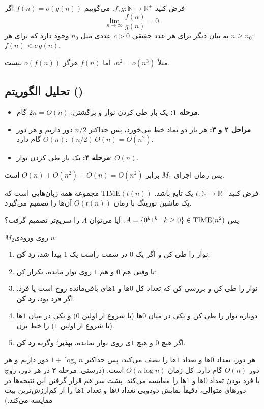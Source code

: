 \begin{definition}[$o$ کوچک]
فرض کنید $f,g:\mathbb{N}\to\mathbb{R}^+$. می‌گوییم $f(n)=o(g(n))$ اگر
\[\lim_{n\to\infty}\frac{f(n)}{g(n)}=0.\]
به بیان دیگر برای هر عدد حقیقی $c>0$ عددی مثل $n_0$ وجود دارد که برای هر $n\ge n_0$: $f(n)<c\,g(n)$.
\end{definition}

مثلاً $n^2=o(n^3)$، اما $f(n)$ هرگز $o(f(n))$ نیست.

\subsection{تحلیل الگوریتم ()}

\begin{example}[تحلیل $M_1$]
\begin{itemize}
\item \textbf{مرحله ۱:} یک بار طی کردن نوار و برگشتن: $2n=O(n)$ گام.
\item \textbf{مراحل ۲ و ۳:} هر بار دو نماد خط می‌خورد، پس حداکثر $n/2$ دور داریم و هر دور $O(n)$ گام دارد: $(n/2)\,O(n)=O(n^2)$.
\item \textbf{مرحله ۴:} یک بار طی کردن نوار: $O(n)$.
\end{itemize}
پس زمان اجرای $M_1$ برابر $O(n)+O(n^2)+O(n)=O(n^2)$ است.
\end{example}

\begin{definition}
فرض کنید $t:\mathbb{N}\to\mathbb{R}^+$ یک تابع باشد.  $\mathrm{TIME}(t(n))$ مجموعه همه زبان‌هایی است که یک ماشین تورینگ با زمان $O(t(n))$ آن‌ها را تصمیم می‌گیرد.
\end{definition}

پس $A=\{0^k1^k\mid k\ge0\}\in\mathrm{TIME}(n^2)$. آیا می‌توان $A$ را سریع‌تر تصمیم گرفت؟

\begin{example}
\begin{algo}{$M_2$}{روی ورودی $w$}
\begin{enumerate}
\item نوار را طی کن و اگر یک $0$ در سمت راست یک $1$ پیدا شد، \textbf{رد کن}.
\item تا وقتی هم $0$ و هم $1$ روی نوار مانده، تکرار کن:
\item \quad نوار را طی کن و بررسی کن که تعداد کل $0$ها و $1$های باقی‌مانده زوج است یا فرد. اگر فرد بود، \textbf{رد کن}.
\item \quad دوباره نوار را طی کن و یکی در میان $0$ها (با شروع از اولین $0$) و یکی در میان $1$ها (با شروع از اولین $1$) را خط بزن.
\item اگر هیچ $0$ و هیچ $1$ی روی نوار نمانده، \textbf{بپذیر}؛ وگرنه \textbf{رد کن}.
\end{enumerate}
\end{algo}
هر دور، تعداد $0$ها و تعداد $1$ها را نصف می‌کند، پس حداکثر $1+\log_2n$ دور داریم و هر دور $O(n)$ گام دارد. کل زمان $O(n\log n)$ است. (درستی: مرحله ۳ در هر دور، زوج یا فرد بودن تعداد $0$ها و $1$ها را مقایسه می‌کند. پشت سر هم قرار گرفتن این نتیجه‌ها در دورهای متوالی، دقیقاً نمایش دودویی تعداد $0$ها و تعداد $1$ها را از کم‌ارزش‌ترین بیت مقایسه می‌کند.)
\end{example}

